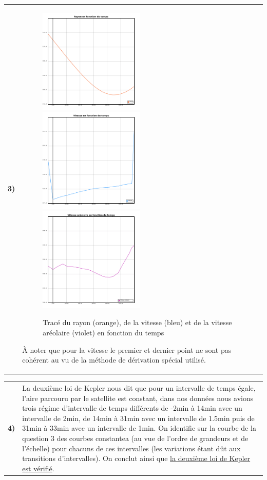 \documentclass{article}
\newcommand{\question}[2]
{
    \begin{tabularx}{\linewidth}{lX}
        \textbf{#1)} & {#2}
    \end{tabularx} 
}
\begin{document}
\question{3}{
  \begin{figure}[H]
    \centering
    \includegraphics[width=50mm]{img/radius.png}
    \includegraphics[width=50mm]{img/velocity.png}
    \includegraphics[width=50mm]{img/areal_velocity.png}
    \caption{Tracé du rayon (orange), de la vitesse (bleu) et de la vitesse aréolaire (violet) en fonction du temps}
  \end{figure}
  À noter que pour la vitesse le premier et dernier point ne sont pas cohérent au vu de la méthode de dérivation spécial utilisé.
}

\question{4}{
  La deuxième loi de Kepler nous dit que pour un intervalle de temps égale, l'aire parcouru par le satellite est constant, dans nos données nous avions trois régime d'intervalle de temps différents de -2min à 14min avec un intervalle de 2min, de 14min à 31min avec un intervalle de 1.5min puis de 31min à 33min avec un intervalle de 1min. On identifie sur la courbe de la question 3 des courbes constantea (au vue de l'ordre de grandeurs et de l'échelle) pour chacuns de ces intervalles (les variations étant dût aux transitions d'intervalles). On conclut ainsi que \underline{la deuxième loi de Kepler est vérifié}.
}
\end{document}
